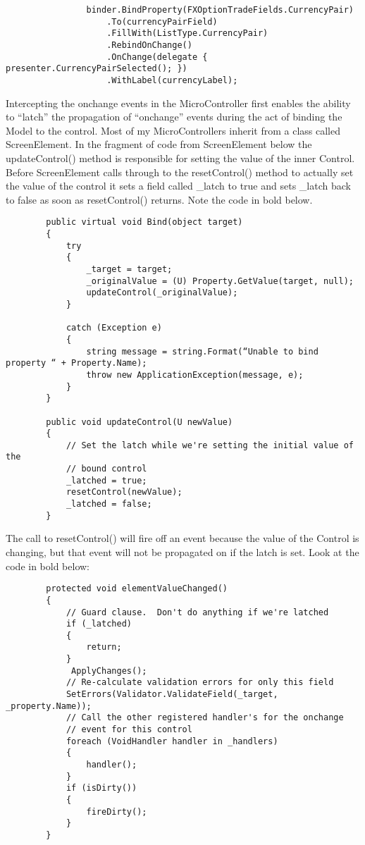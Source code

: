 \documentclass{article}
\begin{document}
{ \begin{lstlisting}
                binder.BindProperty(FXOptionTradeFields.CurrencyPair)
                    .To(currencyPairField)
                    .FillWith(ListType.CurrencyPair)
                    .RebindOnChange()
                    .OnChange(delegate { presenter.CurrencyPairSelected(); })
                    .WithLabel(currencyLabel);
\end{lstlisting}
Intercepting the onchange events in the MicroController first enables the ability to “latch” the propagation of “onchange” events during the act of binding the Model to the control.  Most of my MicroControllers inherit from a class called ScreenElement.  In the fragment of code from ScreenElement below the updateControl() method is responsible for setting the value of the inner Control.  Before ScreenElement calls through to the resetControl() method to actually set the value of the control it sets a field called \_latch to true and sets \_latch back to false as soon as resetControl() returns.  Note the code in bold below.

 \begin{lstlisting}
        public virtual void Bind(object target)
        {
            try
            {
                _target = target;
                _originalValue = (U) Property.GetValue(target, null);
                updateControl(_originalValue);
            }

            catch (Exception e)
            {
                string message = string.Format(“Unable to bind property “ + Property.Name);
                throw new ApplicationException(message, e);
            }
        }

        public void updateControl(U newValue)
        {
            // Set the latch while we're setting the initial value of the 
            // bound control
            _latched = true;
            resetControl(newValue);
            _latched = false;
        }
\end{lstlisting}
\newpage
The call to resetControl() will fire off an event because the value of the  Control is changing, but that event will not be propagated on if the latch is set.  Look at the code in bold below:
\begin{lstlisting}
        protected void elementValueChanged()
        {
            // Guard clause.  Don't do anything if we're latched
            if (_latched)
            {
                return;
            }
             ApplyChanges();
            // Re-calculate validation errors for only this field
            SetErrors(Validator.ValidateField(_target, _property.Name));
            // Call the other registered handler's for the onchange
            // event for this control
            foreach (VoidHandler handler in _handlers)
            {
                handler();
            }
            if (isDirty())
            {
                fireDirty(); 
            }
        }
\end{lstlisting}

}
\end{document}
